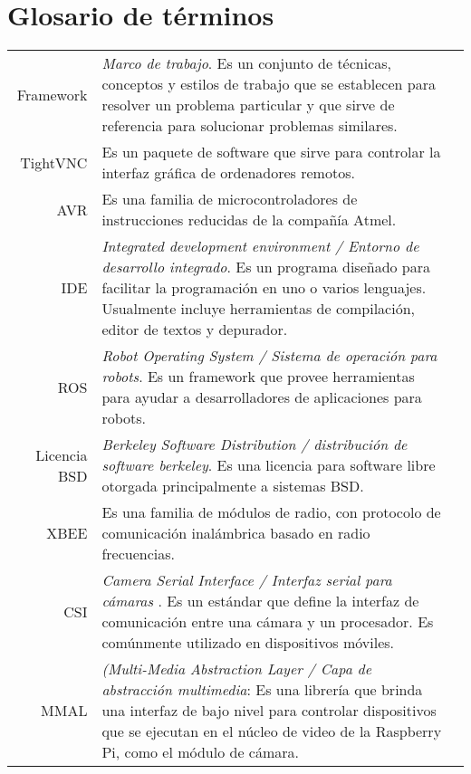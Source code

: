 \section{Glosario de t\'erminos}
\begin{tabular}{r p{16cm}l }
    Framework & \emph{Marco de trabajo}. Es un conjunto de técnicas, conceptos y estilos de trabajo que se establecen para resolver un problema particular y que sirve de referencia para solucionar problemas similares.\\

    TightVNC & Es un paquete de software que sirve para controlar la interfaz gráfica  de ordenadores remotos.\\

    AVR & Es una familia de microcontroladores de instrucciones reducidas de la compañía Atmel.\\

    IDE & \emph{Integrated development environment / Entorno de desarrollo integrado}. Es un programa diseñado para facilitar la programación en uno o varios lenguajes. Usualmente incluye herramientas de compilación, editor de textos y depurador.\\

    ROS & \emph{Robot Operating System / Sistema de operación para robots}. Es un framework que provee herramientas para ayudar a desarrolladores de aplicaciones para robots.\\

    Licencia BSD & \emph{Berkeley Software Distribution / distribución de software berkeley}. Es una licencia para software libre otorgada principalmente a sistemas BSD.\\
    
    XBEE & Es una familia de módulos de radio, con protocolo de comunicación inalámbrica basado en radio frecuencias.\\
    
    CSI & \emph{Camera Serial Interface / Interfaz serial para cámaras }. Es un estándar que define la interfaz de comunicación entre una cámara y un procesador. Es comúnmente utilizado en dispositivos móviles.\\
    
   MMAL & \emph{(Multi-Media Abstraction Layer / Capa de abstracción multimedia}: Es una librería que brinda una interfaz de bajo nivel para controlar dispositivos que se ejecutan en el núcleo de video de la Raspberry Pi, como el módulo de cámara.\\
   

\end{tabular}

